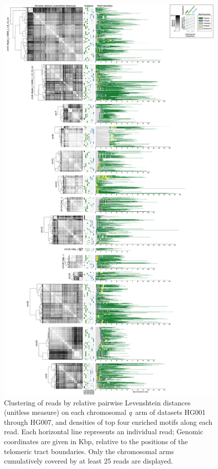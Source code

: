 \documentclass{article}
\begin{document}
                \begin{figure}[h!] \centering %
                \includegraphics[height=.88\textheight,width=\textwidth,keepaspectratio]{renders/figures/Figure-4-lowdpi.png}
                \caption{
                    \small Clustering of reads by relative pairwise Levenshtein distances (unitless measure)
                    on each chromosomal \mbox{\textit{q} arm} of datasets HG001 through HG007,
                    and densities of top four enriched motifs along each read.
                    Each horizontal line represents an individual read;
                    Genomic coordinates are given in Kbp, relative to the positions of the telomeric tract boundaries.
                    Only the chromosomal arms cumulatively covered by at least 25 reads are displayed.
                }
                \label{fig:haplotypes}
                \end{figure}
\end{document}
